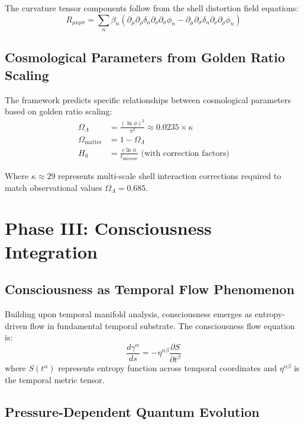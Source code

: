 \documentclass[12pt,a4paper]{article}
\theoremstyle{plain}
\theoremstyle{definition}
\begin{document}
The curvature tensor components follow from the shell distortion field equations:
\begin{equation}
R_{\mu\nu\rho\sigma} = \sum_{n} \beta_n \left( \partial_\mu \partial_\rho \delta_n \partial_\nu \partial_\sigma \phi_n - \partial_\mu \partial_\sigma \delta_n \partial_\nu \partial_\rho \phi_n \right)
\end{equation}

\subsection{Cosmological Parameters from Golden Ratio Scaling}

The framework predicts specific relationships between cosmological parameters based on golden ratio scaling:
\begin{align}
\Omega_{\Lambda} &= \frac{(\ln \phi)^2}{\pi^2} \approx 0.0235 \times \kappa \\
\Omega_{\text{matter}} &= 1 - \Omega_{\Lambda} \\
H_0 &= \frac{c \ln \phi}{t_{\text{universe}}} \text{ (with correction factors)}
\end{align}

Where $\kappa \approx 29$ represents multi-scale shell interaction corrections required to match observational values $\Omega_{\Lambda} = 0.685$.

\section{Phase III: Consciousness Integration}

\subsection{Consciousness as Temporal Flow Phenomenon}

Building upon temporal manifold analysis, consciousness emerges as entropy-driven flow in fundamental temporal substrate. The consciousness flow equation is:
\begin{equation}
\frac{d\gamma^{\alpha}}{ds} = -\eta^{\alpha\beta}\frac{\partial S}{\partial t^{\beta}}
\end{equation}
where $S(t^{\alpha})$ represents entropy function across temporal coordinates and $\eta^{\alpha\beta}$ is the temporal metric tensor.

\subsection{Pressure-Dependent Quantum Evolution}
\end{document}
